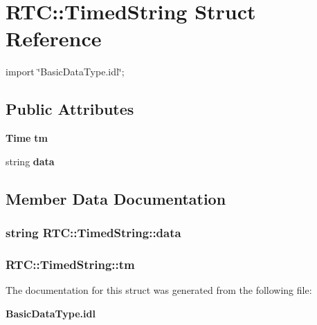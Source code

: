 \section{RTC::TimedString Struct Reference}
\label{structRTC_1_1TimedString}


{\ttfamily import \char`\"{}BasicDataType.idl\char`\"{};}

\subsection*{Public Attributes}
\begin{DoxyCompactItemize}
\item 
{\bf Time} {\bf tm}
\item 
string {\bf data}
\end{DoxyCompactItemize}


\subsection{Member Data Documentation}
\subsubsection[{data}]{\setlength{\rightskip}{0pt plus 5cm}string {\bf RTC::TimedString::data}}\label{structRTC_1_1TimedString_a957ee28a6c97c25c642d039bcb45e947}
\subsubsection[{tm}]{ {\bf RTC::TimedString::tm}}\label{structRTC_1_1TimedString_a06f666e2782f797f9452b83d454ad9fe}


The documentation for this struct was generated from the following file:\begin{DoxyCompactItemize}
\item 
{\bf BasicDataType.idl}\end{DoxyCompactItemize}
